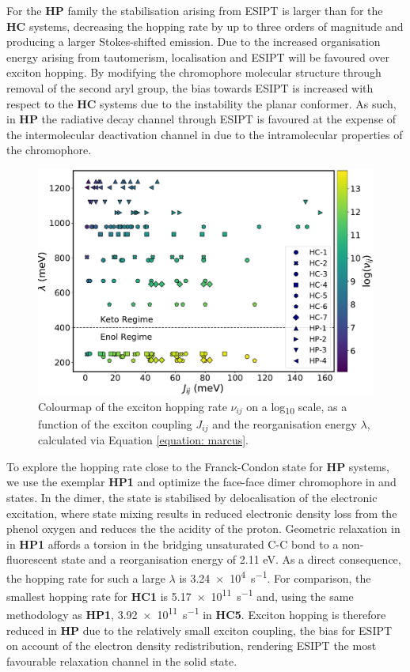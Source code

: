 For the \textbf{HP} family the stabilisation arising from ESIPT is larger than for the \textbf{HC} systems, decreasing the hopping rate by up to three orders of magnitude and producing a larger Stokes-shifted emission. Due to the increased organisation energy arising from tautomerism, localisation and ESIPT will be favoured over exciton hopping. By modifying the chromophore molecular structure through removal of the second aryl group, the bias towards ESIPT is increased with respect to the \textbf{HC} systems due to the instability the planar \Estar{} conformer. As such, in \textbf{HP} the radiative decay channel through ESIPT is favoured at the expense of the intermolecular deactivation channel in \Estar{} due to the intramolecular properties of the chromophore.
\begin{figure}
\centering
  \includegraphics[width=0.8\linewidth]{5ConnectingCrystalStructure/marcus_3dscatter_vdw.pdf}
  \caption[Exciton hopping rates]{Colourmap of the exciton hopping rate $\nu_{ij}$ on a log\textsubscript{10} scale, as a function of the exciton coupling $J_{ij}$ and the reorganisation energy $\lambda$, calculated via Equation \ref{equation: marcus}.}
  \label{figure: marcus_scatter_vdw}
\end{figure}

To explore the hopping rate close to the Franck-Condon state for \textbf{HP} systems, we use the exemplar \textbf{HP1} and optimize the face-face dimer chromophore in \szero{} and \sone{} states. In the dimer, the \Estar{} state is stabilised by delocalisation of the electronic excitation, where state mixing results in reduced electronic density loss from the phenol oxygen and reduces the the acidity of the proton. Geometric relaxation in \Estar{} in \textbf{HP1} affords a torsion in the bridging unsaturated C-C bond to a non-fluorescent state and a reorganisation energy of 2.11 eV. As a direct consequence, the hopping rate for such a large $\lambda$ is \SI{3.24e4}{s^{-1}}. For comparison, the smallest hopping rate for \textbf{HC1} is \SI{5.17e+11}{s^{-1}} and, using the same methodology as \textbf{HP1}, \SI{3.92e+11}{s^{-1}} in \textbf{HC5}. Exciton hopping is therefore reduced in \textbf{HP} due to the relatively small exciton coupling, the bias for ESIPT on account of the electron density redistribution, rendering ESIPT the most favourable relaxation channel in the solid state.

